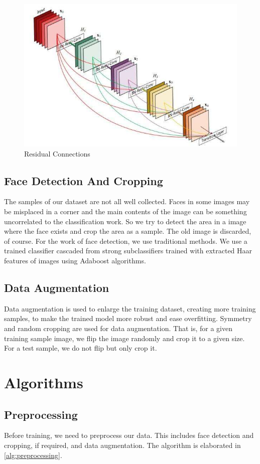 \documentclass[journal, onecolumn]{IEEEtran}
\begin{document}
\begin{figure}
  \centering
  \includegraphics[width=.45\textwidth]{ResNet_the.jpg}
  \caption{Residual Connections}
  \label{fig:ResNetArch}
\end{figure}

\subsection{Face Detection And Cropping}
The samples of our dataset are not all well collected. Faces in some images may be misplaced in a corner and the main contents of the image can be something uncorrelated to the classification work. So we try to detect the area in a image where the face exists and crop the area as a sample. The old image is discarded, of course.
For the work of face detection, we use traditional methods. We use a trained classifier cascaded from strong subclassifiers trained with extracted Haar features of images using Adaboost algorithms.

\subsection{Data Augmentation}
Data augmentation is used to enlarge the training dataset, creating more training samples, to make the trained model more robust and ease overfitting. Symmetry and random cropping are used for data augmentation. That is, for a given training sample image, we flip the image randomly and crop it to a given size. For a test sample, we do not flip but only crop it.


\section{Algorithms}

\subsection{Preprocessing}
Before training, we need to preprocess our data. This includes face detection and cropping, if required, and data augmentation. The algorithm is elaborated in \ref{alg:preprocessing}.
\end{document}

